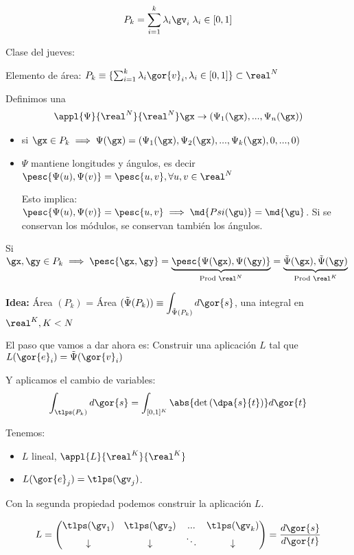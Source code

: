 \[ P_k = \sum_{i=1}^k \lambda_i\gv_i\;\lambda_i \in [0,1] \]

Clase del jueves:


Elemento de área: $P_k \equiv \{ \sum_{i=1}^k \lambda_i\gor{v}_i, \lambda_i \in [0,1]\}\subset \real^N$

Definimos una \begin{gather*}
\appl{\Psi}{\real^N}{\real^N}
\gx \rightarrow (\Psi_1(\gx),...,\Psi_n(\gx))
\end{gather*}

\begin{itemize}
\item si $\gx \in P_k \implies \Psi(\gx) = (\Psi_1(\gx),\Psi_2(\gx),...,\Psi_k(\gx),0,...,0)$
\item $\Psi$ mantiene longitudes y ángulos, es decir $\pesc{\Psi(u),\Psi(v)}=\pesc{u,v}, \forall u,v\in\real^N$

Esto implica: $\pesc{\Psi(u),\Psi(v)}=\pesc{u,v} \implies \md{Psi(\gu)} = \md{\gu}$. Si se conservan los módulos, se conservan también los ángulos.
\end{itemize}

\obs Si $\gx,\gy\in P_k \implies \pesc{\gx,\gy} = \underbrace{\pesc{\Psi(\gx),\Psi(\gy)}}_{\text{Prod } \real^N} = \underbrace{{\tilde{\Psi}(\gx),\tilde{\Psi}(\gy)}}_{\text{Prod } \real^K}$


\textbf{Idea:} Área $(P_k)$ = Área $(\tilde{\Psi}(P_k)) \equiv \displaystyle \int_{\tilde{\Psi}(P_k)}d\gor{s}$, una integral en $\real^K, K<N$



El paso que vamos a dar ahora es: Construir una aplicación $L$ tal que $L(\gor{e}_i) = \tilde{\Psi}(\gor{v}_i)$

Y aplicamos el cambio de variables:
\[\int_{\tlps(P_k)} d\gor{s} = \int_{[0,1]^K} \abs{\det\left( \dpa{s}{t} \right)} d\gor{t}\]

Tenemos: 
\begin{itemize}
\item $L$ lineal, $\appl{L}{\real^K}{\real^K}$
\item $L(\gor{e}_j) = \tlps(\gv_j)$.
\end{itemize}
Con la segunda propiedad podemos construir la aplicación $L$.

\begin{gather*}
L = \begin{pmatrix} \tlps(\gv_1) & \tlps(\gv_2) & ... & \tlps(\gv_k)\\
\downarrow & \downarrow & \ddots & \downarrow
\end{pmatrix} = \frac{d\gor{s}}{d\gor{t}}\end{gather*}

